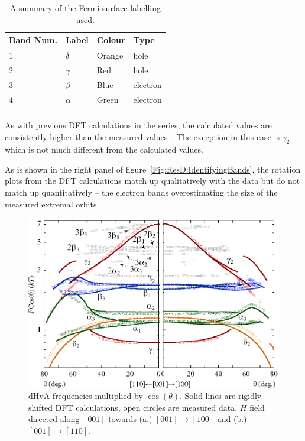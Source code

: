 \begin{table}
    \begin{center}
        \caption{A summary of the Fermi surface labelling used.}
        \begin{tabular}[htbp]{llll}
\toprule
Band Num.  & Label & Colour    & Type \\
\midrule
1   & $\delta$  & Orange    & hole \\
2   & $\gamma$  & Red   & hole \\
3   & $\beta$   & Blue  & electron \\
4   & $\alpha$  & Green & electron \\
\bottomrule
        \label{Tab:ResD:BandNaming}
        \end{tabular}
    \end{center}
\end{table}

As with previous \ac{DFT} calculations in the \BaFeAsP{} series, the calculated values are consistently higher than the measured values~\cite{Shishido2010}. The exception in this case is $\gamma_2$ which is not much different from the calculated values.

As is shown in the right panel of figure~\ref{Fig:ResD:IdentifyingBands}, the rotation plots from the \ac{DFT} calculations match up qualitatively with the data but do not match up quantitatively -- the electron bands overestimating the size of the measured extremal orbits. 

\begin{figure}[htbp]
    \begin{center}
        \includegraphics[scale=0.9]{Chapter-dHvABaFe2P2/Figures/AngleDepMeasurements/AngleSweepRigidShift/AngleSweepRigidShift}
        \caption{\ac{dHvA} frequencies multiplied by $\cos(\theta)$. Solid lines are rigidly shifted \ac{DFT} calculations, open circles are measured data. $H$ field directed along $[001]$ towards (a.) $[001]\rightarrow[100]$ and (b.) $[001]\rightarrow[110]$.}
        \label{Fig:ResD:AngleSweepRigidShift}
    \end{center}
\end{figure}

